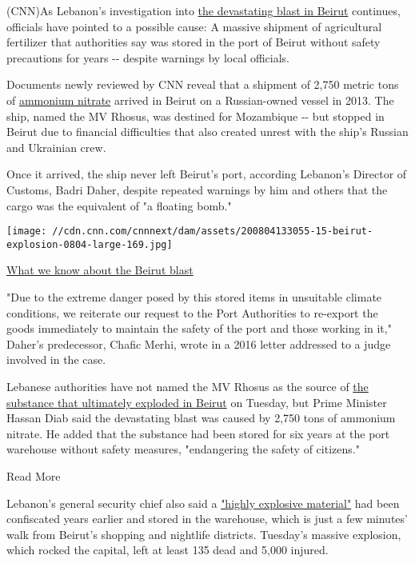 (CNN)As Lebanon's investigation into
\href{https://edition.cnn.com/2020/08/05/middleeast/beirut-qiblawi-analysis-intl/index.html}{the
devastating blast in Beirut} continues, officials have pointed to a
possible cause: A massive shipment of agricultural fertilizer that
authorities say was stored in the port of Beirut without safety
precautions for years -\/- despite warnings by local officials.

Documents newly reviewed by CNN reveal that a shipment of 2,750 metric
tons of
\href{https://edition.cnn.com/2020/08/05/middleeast/beirut-port-explosion-ammonium-nitrate-intl-hnk/index.html}{ammonium
nitrate} arrived in Beirut on a Russian-owned vessel in 2013. The ship,
named the MV Rhosus, was destined for Mozambique -\/- but stopped in
Beirut due to financial difficulties that also created unrest with the
ship's Russian and Ukrainian crew.

Once it arrived, the ship never left Beirut's port, according Lebanon's
Director of Customs, Badri Daher, despite repeated warnings by him and
others that the cargo was the equivalent of "a floating bomb."

\href{/2020/08/05/middleeast/beirut-blast-explainer-intl-hnk/index.html}{}

\texttt{[image: //cdn.cnn.com/cnnnext/dam/assets/200804133055-15-beirut-explosion-0804-large-169.jpg]}

\href{/2020/08/05/middleeast/beirut-blast-explainer-intl-hnk/index.html}{What
we know about the Beirut blast}

"Due to the extreme danger posed by this stored items in unsuitable
climate conditions, we reiterate our request to the Port Authorities to
re-export the goods immediately to maintain the safety of the port and
those working in it," Daher's predecessor, Chafic Merhi, wrote in a 2016
letter addressed to a judge involved in the case.

Lebanese authorities have not named the MV Rhosus as the source of
\href{https://edition.cnn.com/videos/world/2020/08/05/ammonium-nitrate-beirut-lebanon-explosion-sam-kiley-pkg-vpx.cnn}{the
substance that ultimately exploded in Beirut} on Tuesday, but Prime
Minister Hassan Diab said the devastating blast was caused by 2,750 tons
of ammonium nitrate. He added that the substance had been stored for six
years at the port warehouse without safety measures, "endangering the
safety of citizens."

Read More

Lebanon's general security chief also said a
\href{https://edition.cnn.com/2020/08/05/middleeast/beirut-blast-explainer-intl-hnk/index.html}{"highly
explosive material"} had been confiscated years earlier and stored in
the warehouse, which is just a few minutes' walk from Beirut's shopping
and nightlife districts. Tuesday's massive explosion, which rocked the
capital, left at least 135 dead and 5,000 injured.

